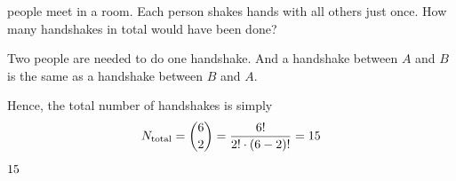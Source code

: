 



\question[4] \text{\vc } people meet in a room. Each person shakes hands with all others just once. 
How many handshakes in total would have been done?

\watchout

\begin{solution}[\mcq]
  Two people are needed to do one handshake. And a handshake between $A$ and $B$ is the same 
  as a handshake between $B$ and $A$. 

  Hence, the total number of handshakes is simply 
  \[ N_{\text{total}} = \binom{6}{2} = \dfrac{6 !}{2!\cdot (6-2)!} = 15 \] 
\end{solution}

\ifprintanswers\begin{codex}$15$\end{codex}\fi
